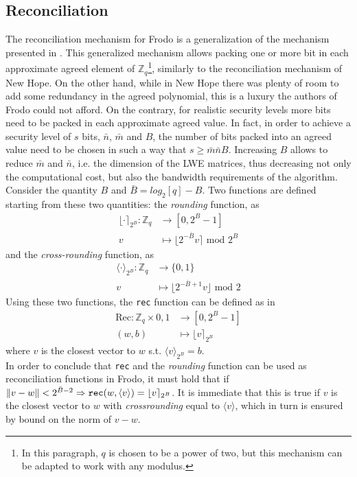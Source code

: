 \subsection{Reconciliation}\label{sec:fr:rec}
The reconciliation mechanism for Frodo is a generalization of the mechanism presented in \cite{peikert_2014}. This generalized mechanism allows packing one or more bit in each approximate agreed element of $\mathbb{Z}_q$\footnote{In this paragraph, $q$ is chosen to be a power of two, but this mechanism can be adapted to work with any modulus.}, similarly to the reconciliation mechanism of New Hope. On the other hand, while in New Hope there was plenty of room to add some redundancy in the agreed polynomial, this is a luxury the authors of Frodo could not afford. On the contrary, for realistic security levels more bits need to be packed in each approximate agreed value. In fact, in order to achieve a security level of $s$ bits, $\bar{n}$, $\bar{m}$ and $B$, the number of bits packed into an agreed value need to be chosen in such a way that $s\ge\bar{m}\bar{n}B$. Increasing $B$ allows to reduce $\bar{m}$ and $\bar{n}$, i.e. the dimension of the LWE matrices, thus decreasing not only the computational cost, but also the bandwidth requirements of the algorithm.\\
Consider the quantity $B$ and $\bar{B}=log_2[q]-B$. Two functions are defined starting from these two quantities: the \textit{rounding} function, as
\begin{align*}
\lfloor \cdot \rceil_{2^B} : \mathbb{Z}_q &\rightarrow [0,2^B-1] \\
v &\mapsto \lfloor 2^{-\bar{B}}v \rceil\text{ mod }2^B
\end{align*}
and the \textit{cross-rounding} function, as
\begin{align*}
\langle \cdot \rangle_{2^B} : \mathbb{Z}_q &\rightarrow \{0,1\}\\
v &\mapsto \lfloor 2^{-\bar{B}+1}v \rfloor\text{ mod }2
\end{align*}
Using these two functions, the \verb|rec| function can be defined as in \cite{peikert_2014}
\begin{align*}
\text{Rec} : \mathbb{Z}_q \times {0,1} &\rightarrow [0,2^B-1]\\
(w,b) &\mapsto \lfloor v \rceil_{2^B}
\end{align*}
where $v$ is the closest vector to $w$ s.t. $\langle v \rangle_{2^B} = b$.\\
In order to conclude that \verb|rec| and the \textit{rounding} function can be used as reconciliation functions in Frodo, it must hold that if $\norm{v-w} < 2^{\bar{B}-2}\Rightarrow\verb|rec|(w,\langle v \rangle)=\lfloor v \rceil_{2^B}$. It is immediate that this is true if $v$ is the closest vector to $w$ with \textit{crossrounding} equal to $\langle v \rangle$, which in turn is ensured by bound on the norm of $v-w$.\\

